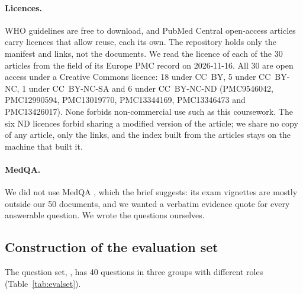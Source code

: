 \paragraph{Licences.} WHO guidelines are free to download, and PubMed Central open-access articles carry licences that allow reuse, each its own. The repository holds only the manifest and links, not the documents. We read the licence of each of the 30 articles from the  field of its Europe PMC record on 2026-11-16. All 30 are open access under a Creative Commons licence: 18 under CC~BY, 5 under CC~BY-NC, 1 under CC~BY-NC-SA and 6 under CC~BY-NC-ND (PMC9546042, PMC12990594, PMC13019770, PMC13344169, PMC13346473 and PMC13426017). None forbids non-commercial use such as this coursework. The six ND licences forbid sharing a modified version of the article; we share no copy of any article, only the links, and the index built from the articles stays on the machine that built it.

\paragraph{MedQA.} We did not use MedQA \citep{jin2021medqa}, which the brief suggests: its exam vignettes are mostly outside our 50 documents, and we wanted a verbatim evidence quote for every answerable question. We wrote the questions ourselves.

\subsection{Construction of the evaluation set}
\label{sec:evalset}

The question set, , has 40 questions in three groups with different roles (Table~\ref{tab:evalset}).

